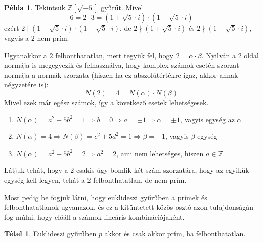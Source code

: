 \documentclass[12pt]{book}
\theoremstyle{plain} %
\theoremstyle{definition} %
\newtheorem{pl}{Példa}[section]
\newtheorem{theo/}{Tétel}[section]
\newenvironment{theo}
  {\renewcommand{\qedsymbol}{$\clubsuit$}%
   \pushQED{\qed}\begin{theo/}}
  {\popQED\end{theo/}}
\theoremstyle{remark}
\renewcommand\qedsymbol{$\blacksquare$}
\numberwithin{equation}{section}  %
\begin{document}
	\begin{pl}
		Tekintsük $\mathbb{Z}[\sqrt{-5}]$ gyűrűt. Mivel
		\[ 6 = 2\cdot 3 = (1+\sqrt{5}\cdot i)\cdot (1-\sqrt{5}\cdot i)  \]
		ezért $2\mid (1+\sqrt{5}\cdot i)\cdot (1-\sqrt{5}\cdot i)$, de $2\nmid (1+\sqrt{5}\cdot i)$ és $2 \nmid (1-\sqrt{5}\cdot i)$, vagyis a $2$ nem prím. \newline
		
		Ugyanakkor a $2$ felbonthatatlan, mert tegyük fel, hogy $2 = \alpha \cdot \beta$. Nyilván a 2 oldal normája is megegyezik és felhasználva, hogy komplex számok esetén szorzat normája a normák szorzata (hiszen ha ez abszolútértékre igaz, akkor annak négyzetére is):
		\[ N(2) = 4 = N(\alpha) \cdot N(\beta)  \]
		Mivel ezek már egész számok, így a következő esetek lehetségesek.
		\begin{enumerate}
			\item $N(\alpha) = a^2+5b^2 = 1 \Rightarrow b=0 \Rightarrow a=\pm 1\Rightarrow \alpha = \pm 1$, vagyis egység az $\alpha$
			\item $N(\alpha) = 4 \Rightarrow N(\beta) = c^2+5d^2 = 1 \Rightarrow \beta = \pm 1 $, vagyis $\beta$ egység
			\item $N(\alpha) = a^2+5b^2 = 2 \Rightarrow a^2 = 2$, ami nem lehetséges, hiszen $a\in \mathbb{Z}$
		\end{enumerate}
		Látjuk tehát, hogy a $2$ csakis úgy bomlik két szám szorzatára, hogy az egyikük egység kell legyen, tehát a $2$ felbonthatatlan, de nem prím.
	\end{pl}
	Most pedig be fogjuk látni, hogy euklideszi gyűrűben a prímek és felbonthatatlanok ugyanazok, és ez a kitüntetett közös osztó azon tulajdonságán fog múlni, hogy előáll a számok lineáris kombinációjaként.
	\begin{theo}
		Euklideszi gyűrűben $p$ akkor és csak akkor prím, ha felbonthatatlan.
	\end{theo}
\end{document}
